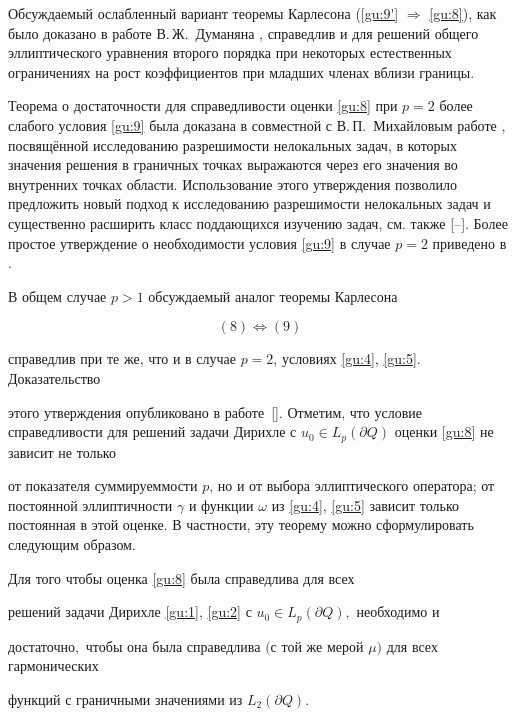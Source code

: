 \smallskip



Обсуждаемый ослабленный вариант теоремы Карлесона (\eqref{gu:9'} $\Rightarrow $ \eqref{gu:8}), как было доказано в работе В.\,Ж.~Думаняна \cite{Dum}, справедлив и для решений общего эллиптического уравнения второго порядка при некоторых естественных ограничениях на рост коэффициентов при младших членах вблизи границы.



Теорема о достаточности для справедливости оценки \eqref{gu:8} при $p = 2$ более слабого условия \eqref{gu:9} была доказана в совместной с В.\,П.~Михайловым работе \cite{GM94}, посвящённой исследованию разрешимости нелокальных задач, в которых значения решения в граничных точках выражаются через его значения во внутренних точках области. Использование этого утверждения позволило предложить новый подход к исследованию разрешимости нелокальных задач и существенно расширить класс поддающихся изучению задач, см. также [--]. Более простое утверждение о необходимости условия \eqref{gu:9} в случае $p = 2$ приведено в \cite{GM08}.



В общем случае $p > 1$ обсуждаемый аналог теоремы Карлесона 

$$


(8) \Longleftrightarrow (9)

$$

справедлив при  те же, что и в случае $p = 2$, условиях \eqref{gu:4}, \eqref{gu:5}. Доказательство

этого утверждения опубликовано в работе~[].  Отметим, что условие справедливости для решений задачи Дирихле с $u_0 \in L_p(\partial Q)$ оценки \eqref{gu:8} не зависит не только

от показателя суммируеммости $p$, но и от выбора эллиптического оператора; от постоянной  эллиптичности $\gamma$ и функции $\omega$ из \eqref{gu:4}, \eqref{gu:5} зависит только постоянная в этой оценке. В частности, эту теорему можно сформулировать следующим образом.



\smallskip



\begin{theorem}[5] Для того чтобы оценка \eqref{gu:8} была справедлива для всех

решений задачи Дирихле \eqref{gu:1}, \eqref{gu:2} с $u_0 \in L_p(\partial Q),$ необходимо и

достаточно$,$ чтобы она была справедлива $($с той же мерой $\mu)$ для всех гармонических

функций с граничными значениями из $L_2(\partial Q).$

\end{theorem}




